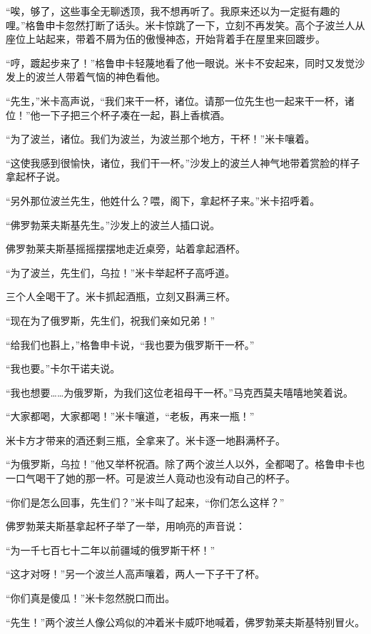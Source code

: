 \par “唉，够了，这些事全无聊透顶，我不想再听了。我原来还以为一定挺有趣的哩。”格鲁申卡忽然打断了话头。米卡惊跳了一下，立刻不再发笑。高个子波兰人从座位上站起来，带着不屑为伍的傲慢神态，开始背着手在屋里来回踱步。
\par “哼，踱起步来了！”格鲁申卡轻蔑地看了他一眼说。米卡不安起来，同时又发觉沙发上的波兰人带着气恼的神色看他。
\par “先生，”米卡高声说，“我们来干一杯，诸位。请那一位先生也一起来干一杯，诸位！”他一下子把三个杯子凑在一起，斟上香槟酒。
\par “为了波兰，诸位。我们为波兰，为波兰那个地方，干杯！”米卡嚷着。
\par “这使我感到很愉快，诸位，我们干一杯。”沙发上的波兰人神气地带着赏脸的样子拿起杯子说。
\par “另外那位波兰先生，他姓什么？喂，阁下，拿起杯子来。”米卡招呼着。
\par “佛罗勃莱夫斯基先生。”沙发上的波兰人插口说。
\par 佛罗勃莱夫斯基摇摇摆摆地走近桌旁，站着拿起酒杯。
\par “为了波兰，先生们，乌拉！”米卡举起杯子高呼道。
\par 三个人全喝干了。米卡抓起酒瓶，立刻又斟满三杯。
\par “现在为了俄罗斯，先生们，祝我们亲如兄弟！”
\par “给我们也斟上，”格鲁申卡说，“我也要为俄罗斯干一杯。”
\par “我也要。”卡尔干诺夫说。
\par “我也想要……为俄罗斯，为我们这位老祖母干一杯。”马克西莫夫嘻嘻地笑着说。
\par “大家都喝，大家都喝！”米卡嚷道，“老板，再来一瓶！”
\par 米卡方才带来的酒还剩三瓶，全拿来了。米卡逐一地斟满杯子。
\par “为俄罗斯，乌拉！”他又举杯祝酒。除了两个波兰人以外，全都喝了。格鲁申卡也一口气喝干了她的那一杯。可是波兰人竟动也没有动自己的杯子。
\par “你们是怎么回事，先生们？”米卡叫了起来，“你们怎么这样？”
\par 佛罗勃莱夫斯基拿起杯子举了一举，用响亮的声音说：
\par “为一千七百七十二年以前疆域的俄罗斯干杯！”
\par “这才对呀！”另一个波兰人高声嚷着，两人一下子干了杯。
\par “你们真是傻瓜！”米卡忽然脱口而出。
\par “先生！”两个波兰人像公鸡似的冲着米卡威吓地喊着，佛罗勃莱夫斯基特别冒火。
